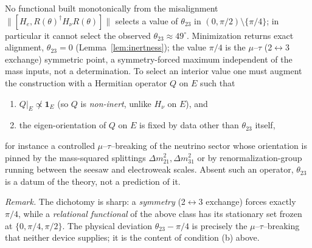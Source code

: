 \begin{corollary}
\label{cor:external}
No functional built monotonically from the misalignment
$\|[H_e,R(\theta)^\dagger H_\nu R(\theta)]\|$ selects a value of $\theta_{23}$ in
$(0,\pi/2)\setminus\{\pi/4\}$; in particular it cannot select the observed
$\theta_{23}\approx49^\circ$. Minimization returns exact alignment,
$\theta_{23}=0$ (Lemma~\ref{lem:inertness}); the value $\pi/4$ is the
$\mu$--$\tau$ (2$\leftrightarrow$3 exchange) symmetric point, a symmetry-forced
maximum independent of the mass inputs, not a determination. To select an
interior value one must augment the construction with a Hermitian operator $Q$
on $E$ such that
\begin{enumerate}
\item[(a)] $Q|_E\not\propto\mathbf 1_E$ (so $Q$ is \emph{non-inert}, unlike
$H_\nu$ on $E$), and
\item[(b)] the eigen-orientation of $Q$ on $E$ is fixed by data other than
$\theta_{23}$ itself,
\end{enumerate}
for instance a controlled $\mu$--$\tau$--breaking of the neutrino sector whose
orientation is pinned by the mass-squared splittings $\Delta m^2_{21},\Delta
m^2_{31}$ or by renormalization-group running between the seesaw and electroweak
scales. Absent such an operator, $\theta_{23}$ is a datum of the theory, not a
prediction of it.
\end{corollary}

\noindent\emph{Remark.} The dichotomy is sharp: a \emph{symmetry}
(2$\leftrightarrow$3 exchange) forces exactly $\pi/4$, while a
\emph{relational functional} of the above class has its stationary set frozen at
$\{0,\pi/4,\pi/2\}$. The physical deviation $\theta_{23}-\pi/4$ is precisely the
$\mu$--$\tau$--breaking that neither device supplies; it is the content of
condition (b) above.
